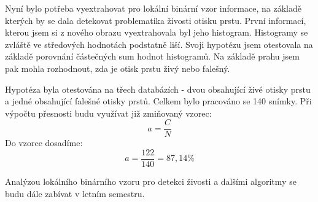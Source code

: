  Nyní bylo potřeba vyextrahovat pro lokální binární vzor informace, na základě kterých by se dala detekovat problematika živosti otisku prstu. První informací, kterou jsem si z nového obrazu vyextrahovala byl jeho histogram. Histogramy se zvláště ve středových hodnotách podstatně liší. Svoji hypotézu jsem otestovala na základě porovnání částečných sum hodnot histogramů. Na základě prahu jsem pak mohla rozhodnout, zda je otisk prstu živý nebo falešný.
 
 Hypotéza byla otestována na třech databázích - dvou obsahující živé otisky prstu a jedné obsahující falešné otisky prstů. Celkem bylo pracováno se 140 snímky. Při výpočtu přesnosti budu využívat již zmiňovaný vzorec:\\
 $$a = \frac{C}{N}$$
 Do vzorce dosadíme:\\
  $$a = \frac{122}{140} = 87,14\%$$
 
 Analýzou lokálního binárního vzoru pro detekci živosti a  dalšími algoritmy se budu dále zabívat v letním semestru.
 
